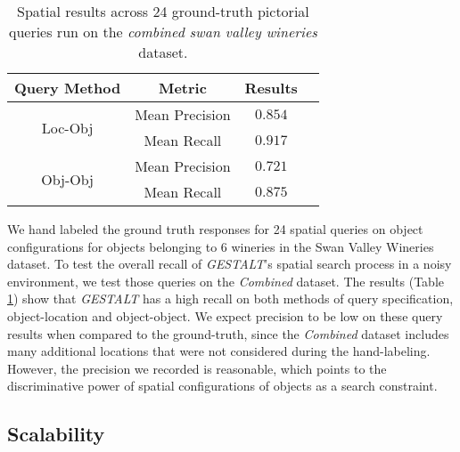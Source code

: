 \small{
\begin{table}[h!]
    \begin{center}
        \begin{tabular}{ |c|c|c|c| } 
            \hline
            Query Method & Metric & Results \\
            \hline
            \multirow{2}{7em}{Loc-Obj} & Mean Precision & $0.854$ \\
            & Mean Recall & $0.917$\\%
            \hline     
            \multirow{2}{7em}{Obj-Obj} & Mean Precision & $0.721$ \\ 
            &Mean Recall & $0.875$ \\
            \hline
        \end{tabular}
        \caption{Spatial results across 24 ground-truth pictorial queries run on the \textit{combined swan valley wineries} dataset.} %
        \label{Table:GroundTruth}
    \end{center}
\end{table}
}
We hand labeled the ground truth responses for 24 spatial queries on object configurations for objects belonging to 6 wineries in the Swan Valley Wineries dataset. 
To test the overall recall of \emph{GESTALT}'s spatial search process in a noisy environment, we test those queries on the \textit{Combined} dataset.
The results (Table \ref{Table:GroundTruth}) show that \emph{GESTALT} has a high recall on both methods of query specification, object-location and object-object.
We expect precision to be low on these query results when compared to the ground-truth, since the \textit{Combined} dataset includes many additional locations that were not considered during the hand-labeling.
However, the precision we recorded is reasonable, which points to the discriminative power of spatial configurations of objects as a search constraint.


\subsection{Scalability}

